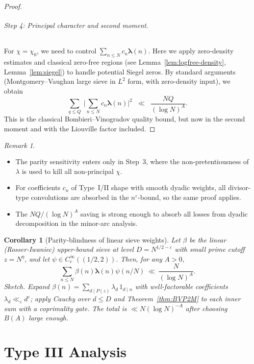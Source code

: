 \documentclass[11pt]{article}
\newcommand{\liou}{\boldsymbol{\lambda}} %
\newtheorem{corollary}[lemma]{Corollary}
\theoremstyle{definition}
\theoremstyle{remark}
\newtheorem{remark}[lemma]{Remark}
\numberwithin{equation}{part}
\begin{document}
\begin{proof}
	\paragraph{Step 4: Principal character and second moment.}
	For $\chi=\chi_0$, we need to control $\sum_{n\le N} c_n \liou(n)$.
	Here we apply zero-density estimates and classical zero-free regions (see Lemma~\ref{lem:logfree-density}, Lemma~\ref{lem:siegel}) to handle potential Siegel zeros.
	By standard arguments (Montgomery–Vaughan large sieve in $L^2$ form, with zero-density input), we obtain
	\[
		\sum_{q\le Q}\ \Biggl|\sum_{n\le N}c_n\liou(n)\Biggr|^2
		\;\;\ll\;\; \frac{NQ}{(\log N)^A}.
	\]
	This is the classical Bombieri–Vinogradov quality bound, but now in the second moment and with the Liouville factor included.
\end{proof}

\begin{remark}
	\
	\begin{itemize}[leftmargin=2em]
		\item The parity sensitivity enters only in Step~3, where the non-pretentiousness of $\lambda$ is used to kill all non-principal $\chi$.
		\item For coefficients $c_n$ of Type~I/II shape with smooth dyadic weights, all divisor-type convolutions are absorbed in the $n^\varepsilon$-bound, so the same proof applies.
		\item The $NQ/(\log N)^A$ saving is strong enough to absorb all losses from dyadic decomposition in the minor-arc analysis.
	\end{itemize}
\end{remark}

\begin{corollary}[Parity-blindness of linear sieve weights]\label{cor:parityblind}
	Let $\beta$ be the linear (Rosser-Iwaniec) upper-bound sieve at level $D=N^{1/2-\varepsilon}$ with small prime cutoff $z=N^{\eta}$, and let $\psi\in C_c^\infty((1/2,2))$. Then, for any $A>0$,
	\[
		\sum_{n\le N}\beta(n)\liou(n)\psi(n/N)\ \ll\ \frac{N}{(\log N)^A}.
	\]
	\emph{Sketch.} Expand $\beta(n)=\sum_{d\mid P(z)}\lambda_d\,1_{d\mid n}$ with well-factorable coefficients $\lambda_d\ll_\varepsilon d^\varepsilon$; apply Cauchy over $d\le D$ and Theorem~\ref{thm:BVP2M} to each inner sum with a coprimality gate. The total is $\ll N(\log N)^{-A}$ after choosing $B(A)$ large enough.
\end{corollary}


\part{Type III Analysis}
\end{document}
